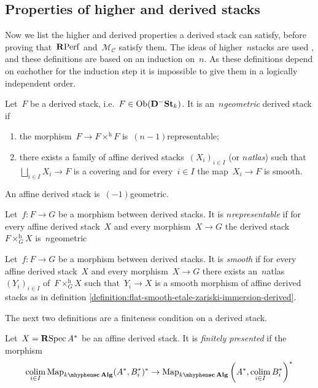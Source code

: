 \begin{refsection}
\subsection{Properties of higher and derived stacks}
Now we list the higher and derived properties a derived stack can satisfy, before proving that~$\mathbf{R}\mathrm{Perf}$ and~$\mathcal{M}_{\mathcal{C}}$ satisfy them. The ideas of higher~$n$\dash stacks are used \cite{simpson}, and these definitions are based on an induction on~$n$. As these definitions depend on eachother for the induction step it is impossible to give them in a logically independent order.
\begin{definition}
  Let~$F$ be a derived stack, i.e.\ $F\in\operatorname{Ob}(\mathbf{D}^-\mathbf{St}_k)$. It is an~\emph{$n$\dash geometric} derived stack if
  \begin{enumerate}
    \item the morphism~$F\to F\times^{\mathrm{h}}F$ is~$(n-1)$\dash representable;
    \item there exists a family of affine derived stacks~$(X_i)_{i\in I}$ (or \emph{$n$\dash atlas}) such that~$\bigsqcup_{i\in I}X_i\to F$ is a covering and for every~$i\in I$ the map~$X_i\to F$ is smooth.
  \end{enumerate}
  An affine derived stack is~$(-1)$\dash geometric.
\end{definition}
\begin{definition}
  Let~$f\colon F\to G$ be a morphism between derived stacks. It is \emph{$n$\dash representable} if for every affine derived stack~$X$ and every morphism~$X\to G$ the derived stack~$F\times_G^{\mathrm{h}}X$ is~$n$\dash geometric
\end{definition}
\begin{definition}
  Let~$f\colon F\to G$ be a morphism between derived stacks. It is \emph{smooth} if for every affine derived stack~$X$ and every morphism~$X\to G$ there exists an~$n$\dash atlas~$(Y_i)_{i\in I}$ of~$F\times_G^{\mathrm{h}}X$ such that~$Y_i\to X$ is a smooth morphism of affine derived stacks as in definition \ref{definition:flat-smooth-etale-zariski-immersion-derived}.
\end{definition}
The next two definitions are a finiteness condition on a derived stack.
\begin{definition}
  Let~$X=\operatorname{\mathbf{R}\mathrm{Spec}} A^*$ be an affine derived stack. It is \emph{finitely presented} if the morphism
  \begin{equation}
    \colim_{i\in I}\Map_{\scAlg{k}}(A^*,B_i^*)^*\to\Map_{\scAlg{k}}\left( A^*,\colim_{i\in I}B_i^* \right)^*

\end{equation}
\end{definition}
\end{refsection}

